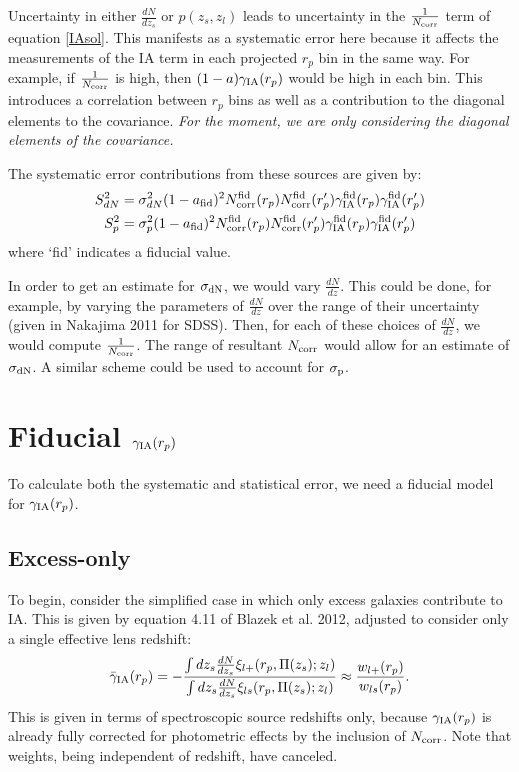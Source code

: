 \documentclass[onecolumn,amsmath,aps,fleqn, superscriptaddress]{revtex4}
\begin{document}
Uncertainty in either $\frac{dN}{dz_s}$ or $p(z_s, z_l)$ leads to uncertainty in the $\frac{1}{N_{\rm corr}}$ term of equation \ref{IAsol}. This manifests as a systematic error here because it affects the measurements of the IA term in each projected $r_p$ bin in the same way. For example, if $\frac{1}{N_{\rm corr}}$ is high, then $(1-a)\gamma_{\rm IA}(r_p)$ would be high in each bin. This introduces a correlation between $r_p$ bins as well as a contribution to the diagonal elements to the covariance. {\it For the moment, we are only considering the diagonal elements of the covariance.}

The systematic error contributions from these sources are given by:
\begin{align}
S_{dN}^2 &= \sigma_{dN}^2 (1-a_{\rm fid})^2 N_{\rm corr}^{{\rm fid}}(r_p) N_{\rm corr}^{{\rm fid}}(r_p')\gamma_{\rm IA}^{\rm fid}(r_p) \gamma_{\rm IA}^{\rm fid}(r_p') \nonumber \\
S_{p}^2 &= \sigma_{p}^2 (1-a_{\rm fid})^2 N_{\rm corr}^{{\rm fid}}(r_p) N_{\rm corr}^{{\rm fid}}(r_p')\gamma_{\rm IA}^{\rm fid}(r_p) \gamma_{\rm IA}^{\rm fid}(r_p') 
\label{S2}
\end{align}
where `fid' indicates a fiducial value.

In order to get an estimate for $\sigma_{\rm dN}$, we would vary $\frac{dN}{dz}$. This could be done, for example, by varying the parameters of $\frac{dN}{dz}$ over the range of their uncertainty (given in Nakajima 2011 for SDSS). Then, for each of these choices of $\frac{dN}{dz}$, we would compute $\frac{1}{N_{\rm corr}}$. The range of resultant $N_{\rm corr}$ would allow for an estimate of $\sigma_{\rm dN}$. A similar scheme could be used to account for $\sigma_{\rm p}$.

\section*{Fiducial $\gamma_{\rm IA}(r_p)$}

To calculate both the systematic and statistical error, we need a fiducial model for $\gamma_{\rm IA}(r_p)$. 

\subsection*{Excess-only}
To begin, consider the simplified case in which only excess galaxies contribute to IA. This is given by equation 4.11 of Blazek et al. 2012, adjusted to consider only a single effective lens redshift:
\begin{equation}
\bar{\gamma}_{\rm IA}(r_p) = -\frac{\int dz_s \frac{dN}{dz_s} \xi_{l+}(r_p, \Pi(z_s); z_l)}{\int dz_s \frac{dN}{dz_s} \xi_{ls}(r_p, \Pi(z_s); z_l)} \approx \frac{w_{l+}(r_p)}{w_{ls}(r_p)}.
\label{gamma_blazek}
\end{equation}
This is given in terms of spectroscopic source redshifts only, because $\gamma_{\rm IA}(r_p)$ is already fully corrected for photometric effects by the inclusion of $N_{\rm corr}$. Note that weights, being independent of redshift, have canceled. 
\end{document}
